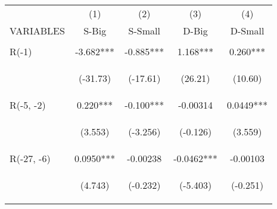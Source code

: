 \documentclass[]{article}
\begin{document}
\begin{center}
\begin{tabular}{lcccc} \hline
 & (1) & (2) & (3) & (4) \\
VARIABLES & S-Big & S-Small & D-Big & D-Small \\ \hline
\vspace{4pt} & \begin{footnotesize}\end{footnotesize} & \begin{footnotesize}\end{footnotesize} & \begin{footnotesize}\end{footnotesize} & \begin{footnotesize}\end{footnotesize} \\
R(-1) & -3.682*** & -0.885*** & 1.168*** & 0.260*** \\
\vspace{4pt} & \begin{footnotesize}(-31.73)\end{footnotesize} & \begin{footnotesize}(-17.61)\end{footnotesize} & \begin{footnotesize}(26.21)\end{footnotesize} & \begin{footnotesize}(10.60)\end{footnotesize} \\
R(-5, -2) & 0.220*** & -0.100*** & -0.00314 & 0.0449*** \\
\vspace{4pt} & \begin{footnotesize}(3.553)\end{footnotesize} & \begin{footnotesize}(-3.256)\end{footnotesize} & \begin{footnotesize}(-0.126)\end{footnotesize} & \begin{footnotesize}(3.559)\end{footnotesize} \\
R(-27, -6) & 0.0950*** & -0.00238 & -0.0462*** & -0.00103 \\
\vspace{4pt} & \begin{footnotesize}(4.743)\end{footnotesize} & \begin{footnotesize}(-0.232)\end{footnotesize} & \begin{footnotesize}(-5.403)\end{footnotesize} & \begin{footnotesize}(-0.251)\end{footnotesize} \\

\end{tabular}
\end{center}
\end{document}
